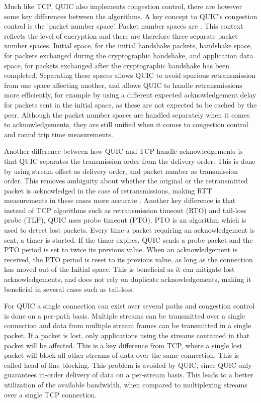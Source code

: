 Much like TCP, QUIC also implements congestion control, there are
however some key differences between the algorithms. A key concept
to QUIC's congestion control is the 'packet number space'. Packet
number spaces are  \cite{iyengarQUICUDPBasedMultiplexed2021}. 
This context reflects the level of encryption and there 
are therefore three separate packet number spaces. Initial space,
for the initial handshake packets, handshake space, for packets
exchanged during the cryptographic handshake, and application
data space, for packets exchanged after the cryptographic handshake
has been completed. Separating these spaces allows QUIC to
avoid spurious retransmission from one space affecting another,
and allows QUIC to handle retransmissions more efficiently, for
example by using a different expected acknowledgement delay for packets sent
in the initial space, as these are not expected to be cached
by the peer. Although the packet number spaces are handled
separately when it comes to acknowledgements, they are still
unified when it comes to congestion control and round trip
time measurements.

Another difference between how QUIC and TCP handle acknowledgements
is that QUIC separates the transmission order from the delivery order.
This is done by using stream offset as delivery order, and packet number as
transmission order. This removes ambiguity about whether the
original or the retransmitted packet is acknowledged in the case
of retransmissions, making RTT measurements in these cases more accurate
\cite{iyengarQUICUDPBasedMultiplexed2021}. Another key difference
is that instead of TCP algorithms such as retransmission timeout (RTO)
and tail-loss probe (TLP), QUIC uses probe timeout (PTO).
PTO is an algorithm which is used to detect lost packets. Every
time a packet requiring an acknowledgement is sent, a timer is started. If
the timer expires, QUIC sends a probe packet and the PTO period is
set to twice its previous value. When an acknowledgement is received,
the PTO period is reset to its previous value, as long as the
connection has moved out of the Initial space. This is beneficial
as it can mitigate lost acknowledgements, and does not rely on
duplicate acknowledgements, making it beneficial in several cases
such as tail-loss. 

For QUIC a single connection can exist over several paths and
congestion control is done on a per-path basis. Multiple streams
can be transmitted over a single connection and data from
multiple stream frames can be transmitted in a single packet.
If a packet is lost, only applications using the streams contained
in that packet will be affected. This is a key difference from TCP,
where a single lost packet will block all other streams of data
over the same connection. This is called head-of-line blocking.
This problem is avoided by QUIC, since QUIC only guarantees
in-order delivery of data on a per-stream basis. This leads
to a better utilization of the available bandwidth, when
compared to multiplexing streams over a single TCP connection.

